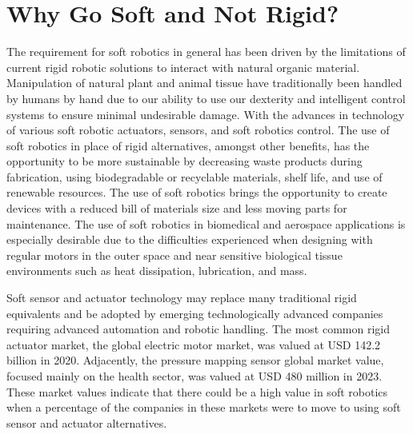 \section{Why Go Soft and Not Rigid?}
The requirement for soft robotics in general has been driven by the limitations of current rigid robotic solutions to interact with natural organic material. Manipulation of natural plant and animal tissue have traditionally been handled by humans by hand due to our ability to use our dexterity and intelligent control systems to ensure minimal undesirable damage. With the advances in technology of various soft robotic actuators\cite{Stella2023,Zhang2023,Hartmann2021,Yasa2023, Manti2016}, sensors\cite{Hegde2023}, and soft robotics control\cite{DellaSantina2023, Armanini2023}. The use of soft robotics in place of rigid alternatives, amongst other benefits, has the opportunity to be more sustainable by decreasing waste products during fabrication, using biodegradable or recyclable materials, shelf life, and use of renewable resources\cite{Hartmann2021}. The use of soft robotics brings the opportunity to create devices with a reduced bill of materials size and less moving parts for maintenance. The use of soft robotics in biomedical and aerospace applications is especially desirable due to the difficulties experienced when designing with regular motors in the outer space and near sensitive biological tissue environments such as heat dissipation, lubrication, and mass\cite{Murugesan1981,Ashuri2020,Branz2017,Bruschi2021}. 

Soft sensor and actuator technology may replace many traditional rigid equivalents and be adopted by emerging technologically advanced companies requiring advanced automation and robotic handling. The most common rigid actuator market, the global electric motor market, was valued at USD 142.2 billion in 2020\cite{alliedmarketresearch}. Adjacently, the pressure mapping sensor global market value, focused mainly on the health sector, was valued at USD 480 million in 2023\cite{Bharatha2023}. These market values indicate that there could be a high value in soft robotics when a percentage of the companies in these markets were to move to using soft sensor and actuator alternatives.


